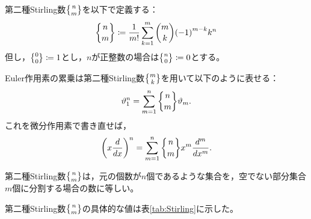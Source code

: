 \documentclass[a4paper,draft]{ltjsarticle}
\begin{document}
\begin{defi}[第二種Stirling数]
    第二種Stirling数$\sstir{n}{m}$を以下で定義する：
    \begin{equation}
        \stir{n}{m}\coloneqq \frac{1}{m!}\sum_{k=1}^m\binom{m}{k}\pare{-1}^{m-k} k^n 
    \end{equation}
    但し，$\sstir{0}{0}\coloneqq 1$とし，$n$が正整数の場合は$\sstir{n}{0}\coloneqq 0$とする。
\end{defi}


\begin{cor}
    Euler作用素の累乗は第二種Stirling数$\sstir{m}{k}$を用いて以下のように表せる：
    \begin{equation}
        \eu{1}^n=\sum_{m=1}^n \stir{n}{m}\eu{m}.
    \end{equation}
    これを微分作用素で書き直せば，
    \begin{equation}
        \pare{x\diff{}{x}}^n=\sum_{m=1}^n \stir{n}{m} x^m \diffn{}{x}{m}.
    \end{equation}
\end{cor}

\begin{supple}
    第二種Stirling数$\sstir{n}{m}$は，元の個数が$n$個であるような集合を，空でない部分集合$m$個に分割する場合の数に等しい。
\end{supple}

\begin{eg}
    第二種Stirling数$\sstir{n}{m}$の具体的な値は表\ref{tab:Stirling}に示した。
\end{eg}
\end{document}
